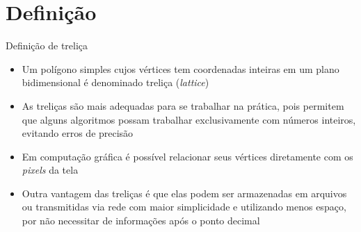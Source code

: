 \section{Definição}

\begin{frame}[fragile]{Definição de treliça}

    \begin{itemize}
        \item Um polígono simples cujos vértices tem coordenadas inteiras em um plano 
            bidimensional é denominado treliça ({\it lattice})
        \pause

        \item As treliças são mais adequadas para se trabalhar na prática, pois permitem que
            alguns algoritmos possam trabalhar exclusivamente com números inteiros, 
            evitando erros de precisão
        \pause

        \item Em computação gráfica é possível relacionar seus vértices diretamente com os
            \textit{pixels} da tela
        \pause

        \item Outra vantagem das treliças é que elas podem ser armazenadas em arquivos ou
            transmitidas via rede com maior simplicidade e utilizando menos espaço, por
            não necessitar de informações após o ponto decimal
        
    \end{itemize}

\end{frame}

